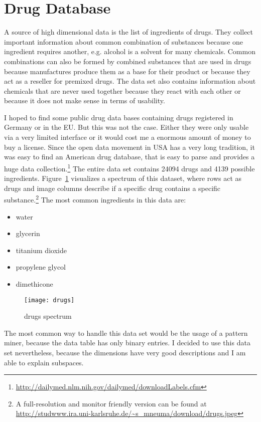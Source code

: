 \section{Drug Database}
A source of high dimensional data is the list of ingredients of drugs. They collect important information about common combination of substances because one ingredient requires another, e.g. alcohol is a solvent for many chemicals. Common combinations can also be formed by combined substances that are used in drugs because manufactures produce them as a base for their product or because they act as a reseller for premixed drugs. The data set also contains information about chemicals that are never used together because they react with each other or because it does not make sense in terms of usability.

I hoped to find some public drug data bases containing drugs registered in Germany or in the EU. But this was not the case. Either they were only usable via a very limited interface or it would cost me a enormous amount of money to buy a license. Since the open data movement in USA has a very long tradition, it was easy to find an American drug database, that is easy to parse and provides a huge data collection.\footnote{\url{http://dailymed.nlm.nih.gov/dailymed/downloadLabels.cfm}} The entire data set contains \num{24094} drugs and \num{4139} possible ingredients. Figure~\ref{fig:drugs} visualizes a spectrum of this dataset, where rows act as drugs and image columns describe if a specific drug contains a specific substance.\footnote{A full-resolution and monitor friendly version can be found at\\ \url{http://studwww.ira.uni-karlsruhe.de/~s_mneuma/download/drugs.jpeg}} The most common ingredients in this data are:
\begin{itemize}
	\item water
	\item glycerin
	\item titanium dioxide
	\item propylene glycol
	\item dimethicone
\end{itemize}

\begin{figure}
	\texttt{[image: drugs]}
	\caption{drugs spectrum}
	\label{fig:drugs}
\end{figure}

The most common way to handle this data set would be the usage of a pattern miner, because the data table has only binary entries. I decided to use this data set nevertheless, because the dimensions have very good descriptions and I am able to explain subspaces.

